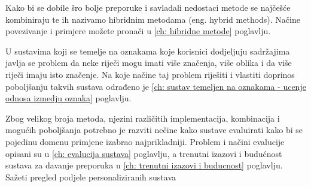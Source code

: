 \documentclass[a4paper,oneside,12pt]{memoir} %
\begin{document}
\par
Kako bi se dobile šro bolje preporuke i savladali nedostaci metode se najčešće kombiniraju te ih nazivamo hibridnim metodama (eng. hybrid methods). Načine povezivanje i primjere možete pronači u
\ref{ch: hibridne metode} poglavlju.
\par
U sustavima koji se temelje na oznakama koje korisnici dodjeljuju sadržajima javlja se problem da neke riječi mogu imati više značenja, više oblika i da više riječi imaju isto značenje. Na koje načine taj problem riješiti i vlastiti doprinos poboljšanju takvih sustava odrađeno je \ref{ch: sustav temeljen na oznakama - ucenje odnosa izmedju oznaka} poglavlju.
\par
Zbog velikog broja metoda, njezini različitih implementacija, kombinacija i mogućih poboljšanja potrebno je razviti nečine kako sustave evaluirati kako bi se pojedinu domenu primjene izabrao najprikladniji. Problem i načini evalucije opisani su u \ref{ch: evalucija sustava} poglavlju, a trenutni izazovi i budućnost sustava za davanje preporuka u \ref{ch: trenutni izazovi i buducnost} poglavlju.
\bigskip
\\ Sažeti pregled podjele personaliziranih sustava
\end{document}
